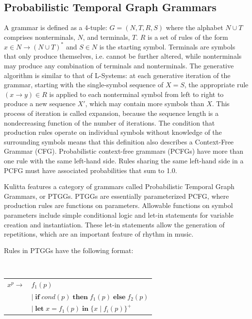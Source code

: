 \documentclass{article}
\begin{document}
\subsection{Probabilistic Temporal Graph Grammars}

A grammar is defined as a 4-tuple: $G = (N,T,R,S)$ where the alphabet $N \cup T$ comprises nonterminals, $N$, and terminals, $T$. $R$ is a set of rules of the form $x \in N \rightarrow (N \cup T)^{*}$ and $S \in N$ is the starting symbol. Terminals are symbols that only produce themselves, i.e. cannot be further altered, while nonterminals may produce any combination of terminals and nonterminals. The generative algorithm is similar to that of L-Systems: at each generative iteration of the grammar, starting with the single-symbol sequence of $X = S$, the appropriate rule $(x \rightarrow y) \in R$ is applied to each nonterminal symbol from left to right to produce a new sequence $X'$, which may contain more symbols than $X$. This process of iteration is called expansion, because the sequence length is a nondecreasing function of the number of iterations. The condition that production rules operate on individual symbols without knowledge of the surrounding symbols means that this definition also describes a Context-Free Grammar (CFG). Probabilistic context-free grammars (PCFGs) have more than one rule with the same left-hand side. Rules sharing the same left-hand side in a PCFG must have associated probabilities that sum to 1.0.

Kulitta features a category of grammars called Probabilistic Temporal Graph Grammars\cite{quick2013farm, quick_thesis}, or PTGGs. PTGGs are essentially parameterized PCFG, where production rules are functions on parameters. Allowable functions on symbol parameters include simple conditional logic and let-in statements for variable creation and instantiation. These let-in statements allow the generation of repetitions, which are an important feature of rhythm in music.


Rules in PTGGs have the following format:

$\;$ \\
\begin{tabular}{ll}
$x^p \rightarrow$ & $f_{1}(p)$ \\
$\;$ & $ \vert \;  \textbf{if} \; cond(p) \; \textbf{then} \; f_{1}(p) \; \textbf{else} \; f_{2}(p)$ \\
$\;$ & $\vert \; \textbf{let} \; x = f_{1}(p) \; \textbf{in} \; \{x \; | \; f_{i}(p)\}^{+}$ \\
\end{tabular} $\;$ \\
\end{document}

